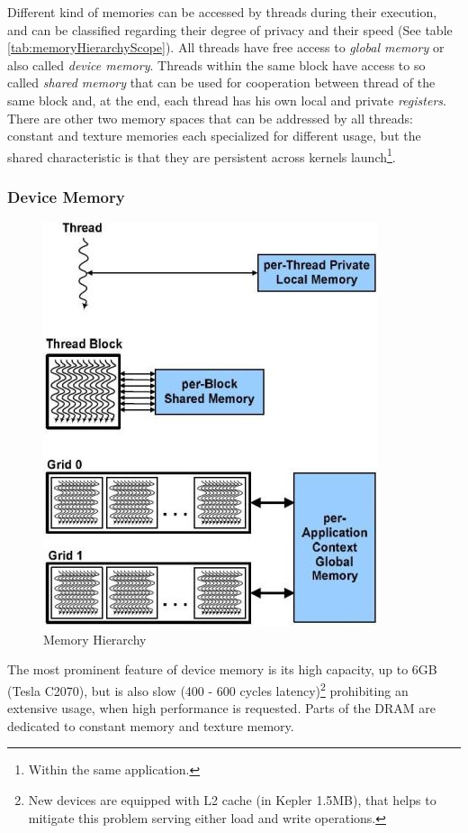 Different kind of memories can be accessed by threads during their execution,
and can be classified regarding their degree of privacy and their speed (See
table \ref{tab:memoryHierarchyScope}).
All threads have free access to \emph{global memory} or also called \emph{device
memory}. Threads within the same block have access to so called \emph{shared
memory} that can be used for cooperation between thread of the same block and,
at the end, each thread has his own local and private \emph{registers}. There
are other two memory spaces that can be addressed by all threads: constant and
texture memories each specialized for different usage, but the shared
characteristic is that they are persistent across kernels launch\footnote{Within
the same application.}.



\subsubsection{Device Memory}
\begin{figure}
\caption{Memory Hierarchy}\label{memoryHierarchy}
\includegraphics[scale=0.9]{./images/memoryhierarchy}
\end{figure}

The most prominent feature of device memory is its high capacity,
up to 6GB (Tesla C2070), but is also slow (400 - 600 cycles
latency)\footnote{New devices are equipped with L2 cache (in Kepler 1.5MB), that
helps to mitigate this problem serving either load and write operations.}
prohibiting an extensive usage, when high performance is requested.
Parts of the DRAM are dedicated to constant memory and texture memory.

